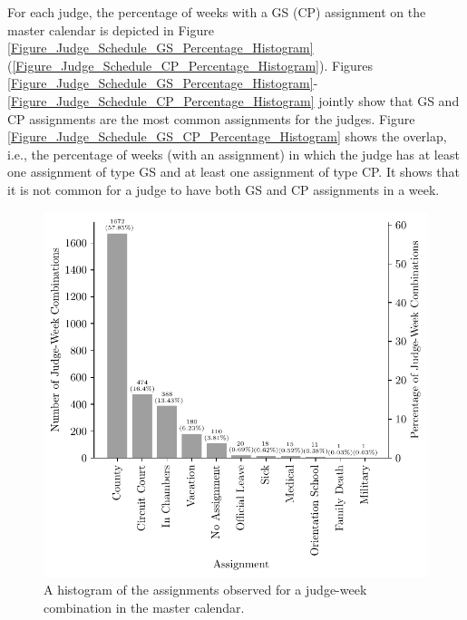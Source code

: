 \documentclass[11pt, oneside]{article}   	%
\theoremstyle{ModifiedStyle}
\begin{document}
	For each judge, the percentage of weeks with a GS (CP) assignment on the master calendar is depicted in Figure \ref{Figure_Judge_Schedule_GS_Percentage_Histogram} (\ref{Figure_Judge_Schedule_CP_Percentage_Histogram}). Figures \ref{Figure_Judge_Schedule_GS_Percentage_Histogram}-\ref{Figure_Judge_Schedule_CP_Percentage_Histogram} jointly show that GS and CP assignments are the most common assignments for the judges. Figure \ref{Figure_Judge_Schedule_GS_CP_Percentage_Histogram} shows the overlap, i.e., the percentage of weeks (with an assignment) in which the judge has at least one assignment of type GS and at least one assignment of type CP. It shows that it is not common for a judge to have both GS and CP assignments in a week.

	\begin{figure}[H]
		\centering
		\hspace*{-8mm}
		\begin{minipage}{.45\textwidth}
			\centering
			\hspace*{-10mm}
			\includegraphics[scale=0.67]{Figures/Type_of_Assignment_Histogram}
			\vspace*{-7mm}
			\caption{A histogram of the assignments observed for a judge-week combination in the master calendar.}
			\label{Figure_Assignment_Histogram}
		\end{minipage}
		\hspace{5mm}

\end{figure}
\end{document}
